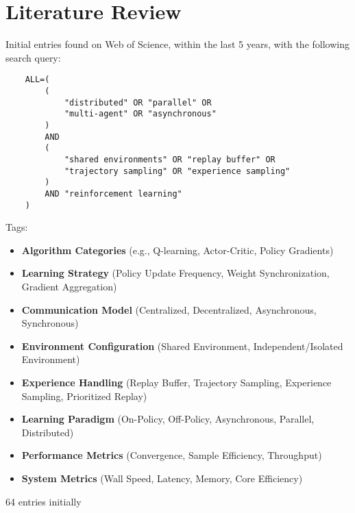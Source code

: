 \section{Literature Review}
\label{sec:literature_review}

Initial entries found on Web of Science, within the last 5 years, with the following search query:

\begin{verbatim}
    ALL=(
        (
            "distributed" OR "parallel" OR
            "multi-agent" OR "asynchronous"
        )
        AND
        (
            "shared environments" OR "replay buffer" OR
            "trajectory sampling" OR "experience sampling"
        )
        AND "reinforcement learning"
    )
\end{verbatim}

Tags:


\begin{itemize}[leftmargin=*, label={--}]
    \item \textbf{Algorithm Categories} (e.g., Q-learning, Actor-Critic, Policy Gradients)
    \item \textbf{Learning Strategy} (Policy Update Frequency, Weight Synchronization, Gradient Aggregation)
    \item \textbf{Communication Model} (Centralized, Decentralized, Asynchronous, Synchronous)
    \item \textbf{Environment Configuration} (Shared Environment, Independent/Isolated Environment)
    \item \textbf{Experience Handling} (Replay Buffer, Trajectory Sampling, Experience Sampling, Prioritized Replay)
    \item \textbf{Learning Paradigm} (On-Policy, Off-Policy, Asynchronous, Parallel, Distributed)
    \item \textbf{Performance Metrics} (Convergence, Sample Efficiency, Throughput)
    \item \textbf{System Metrics} (Wall Speed, Latency, Memory, Core Efficiency)
\end{itemize}


64 entries initially
